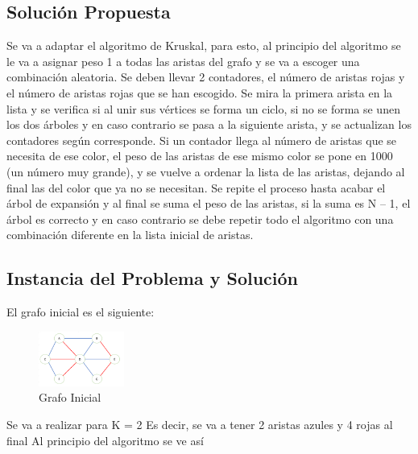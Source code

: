 \documentclass[conference,compsoc]{IEEEtran}
\begin{document}
\subsection{Solución Propuesta}
Se va a adaptar el algoritmo de Kruskal, para esto, al principio del algoritmo se le va a asignar peso 1 a todas las aristas del grafo y se va a escoger una combinación aleatoria. Se deben llevar 2 contadores, el número de aristas rojas y el número de aristas rojas que se han escogido. Se mira la primera arista en la lista y se verifica si al unir sus vértices se forma un ciclo, si no se forma se unen los dos árboles y en caso contrario se pasa a la siguiente arista, y se actualizan los contadores según corresponde. Si un contador llega al número de aristas que se necesita de ese color, el peso de las aristas de ese mismo color se pone en 1000 (un número muy grande), y se vuelve a ordenar la lista de las aristas, dejando al final las del color que ya no se necesitan. Se repite el proceso hasta acabar el árbol de expansión y al final se suma el peso de las aristas, si la suma es N – 1, el árbol es correcto y en caso contrario se debe repetir todo el algoritmo con una combinación diferente en la lista inicial de aristas.

\subsection{Instancia del Problema y Solución}


El grafo inicial es el siguiente:

\begin{figure}[h] 
    \centering
    \includegraphics[width=0.25\textwidth]{Problema2/s1.png}
    \caption{Grafo Inicial}
    \label{fig:mesh1}
\end{figure}

Se va a realizar para K = 2
Es decir, se va a tener 2 aristas azules y 4 rojas al final
Al principio del algoritmo se ve así
\end{document}
